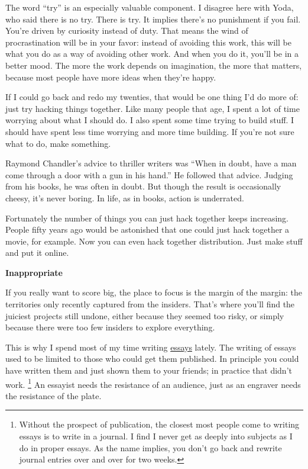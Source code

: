 \documentclass[12pt]{book}
\begin{document}
The word ``try'' is an especially valuable component. I disagree here
with Yoda, who said there is no try. There is try. It implies there's no
punishment if you fail. You're driven by curiosity instead of duty. That
means the wind of procrastination will be in your favor: instead of
avoiding this work, this will be what you do as a way of avoiding other
work. And when you do it, you'll be in a better mood. The more the work
depends on imagination, the more that matters, because most people have
more ideas when they're happy.

If I could go back and redo my twenties, that would be one thing I'd do
more of: just try hacking things together. Like many people that age, I
spent a lot of time worrying about what I should do. I also spent some
time trying to build stuff. I should have spent less time worrying and
more time building. If you're not sure what to do, make something.

Raymond Chandler's advice to thriller writers was ``When in doubt, have
a man come through a door with a gun in his hand.'' He followed that
advice. Judging from his books, he was often in doubt. But though the
result is occasionally cheesy, it's never boring. In life, as in books,
action is underrated.

Fortunately the number of things you can just hack together keeps
increasing. People fifty years ago would be astonished that one could
just hack together a movie, for example. Now you can even hack together
distribution. Just make stuff and put it online.

\textbf{Inappropriate}

If you really want to score big, the place to focus is the margin of the
margin: the territories only recently captured from the insiders. That's
where you'll find the juiciest projects still undone, either because
they seemed too risky, or simply because there were too few insiders to
explore everything.

This is why I spend most of my time writing \href{essay.html}{essays}
lately. The writing of essays used to be limited to those who could get
them published. In principle you could have written them and just shown
them to your friends; in practice that didn't work.
\footnote{Without the prospect of publication, the closest most people
come to writing essays is to write in a journal. I find I never get as
deeply into subjects as I do in proper essays. As the name implies, you
don't go back and rewrite journal entries over and over for two weeks.} An essayist needs the resistance of an audience,
just as an engraver needs the resistance of the plate.
\end{document}
